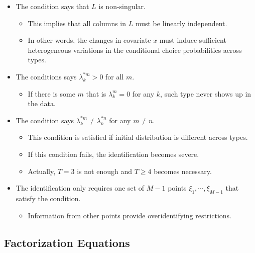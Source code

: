 \documentclass[
]{book}
\providecommand{\tightlist}{%
  \setlength{\itemsep}{0pt}\setlength{\parskip}{0pt}}
\begin{document}
\begin{itemize}
\tightlist
\item
  The condition says that \(L\) is non-singular.

  \begin{itemize}
  \tightlist
  \item
    This implies that all columns in \(L\) must be linearly independent.
  \item
    In other words, the changes in covariate \(x\) must induce sufficient heterogeneous variations in the conditional choice probabilities across types.
  \end{itemize}
\item
  The conditions says \(\lambda_k^{*m} > 0\) for all \(m\).

  \begin{itemize}
  \tightlist
  \item
    If there is some \(m\) that is \(\lambda_k^m = 0\) for any \(k\), such type never shows up in the data.
  \end{itemize}
\item
  The condition says \(\lambda_k^{*m} \neq \lambda_k^{*n}\) for any \(m \neq n\).

  \begin{itemize}
  \tightlist
  \item
    This condition is satisfied if initial distribution is different across types.
  \item
    If this condition fails, the identification becomes severe.
  \item
    Actually, \(T = 3\) is not enough and \(T \ge 4\) becomes necessary.
  \end{itemize}
\item
  The identification only requires one set of \(M - 1\) points \(\xi_1, \cdots, \xi_{M - 1}\) that satisfy the condition.

  \begin{itemize}
  \tightlist
  \item
    Information from other points provide overidentifying restrictions.
  \end{itemize}
\end{itemize}

\hypertarget{factorization-equations}{%
\subsection{Factorization Equations}\label{factorization-equations}}
\end{document}
